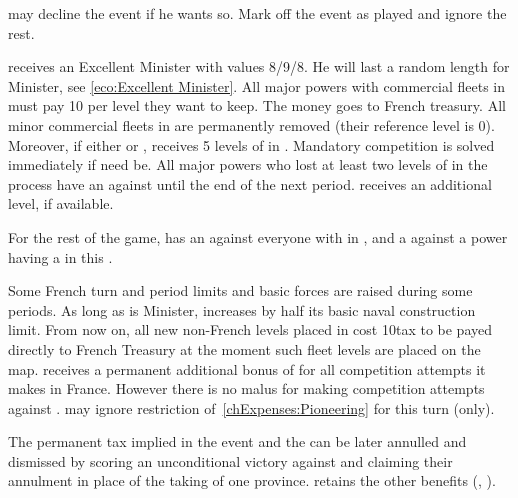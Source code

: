 
\condition{}
\aparag \FRA may decline the event if he wants so. Mark off the event as
played and ignore the rest.

\phevnt
\aparag \FRA receives an Excellent Minister  with
values 8/9/8. He will last a random length for Minister, see
\ref{eco:Excellent Minister}.
\aparag All major powers with commercial fleets in  must pay 10
\ducats per level they want to keep. The money goes to French treasury. All
minor commercial fleets in  are permanently removed (their
reference level is 0).
\aparag Moreover, if either \CATHCR or \CATHCO, \FRA receives 5 levels of
\TradeFLEET in .  Mandatory competition is solved immediately if
need be.
\aparag All major powers who lost at least two levels of \TradeFLEET in the
process have an \OCB against \FRA until the end of the next period.
\aparag \FRA receives an additional  \MNU level, if available.

\phdipl
\aparag For the rest of the game, \FRA has an \OCB against everyone with
\TradeFLEET in , and a \CB against a power having a
\TradeFLEET\faceplus in this \CTZ.

\phadm
\aparag\label{pV:Colbert:limits} Some French turn and period limits and basic
forces are raised during some periods.
\aparag As long as \ministreColbert is Minister, \FRA increases by half its
basic naval construction limit.
\aparag From now on, all new non-French \TradeFLEET levels placed in
 cost 10\ducats tax to be payed directly to French Treasury at the
moment such fleet levels are placed on the map.
\aparag\label{pV:Colbert:CB} \FRA receives a permanent additional bonus of
 for all competition attempts it makes in \CTZ France. However there
is no malus for making competition attempts against \FRA.
\aparag \FRA may ignore restriction of~\ref{chExpenses:Pioneering} for this
turn (only).

\phpaix
\aparag The permanent tax implied in the event and the \CB can be later
annulled and \ministreColbert dismissed by scoring an unconditional victory
against \FRA and claiming their annulment in place of the taking of one
province. \FRA retains the other benefits (,
).



